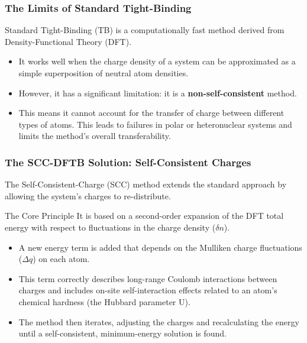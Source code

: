 \begin{frame}
  \frametitle{The Limits of Standard Tight-Binding}
  
  Standard Tight-Binding (TB) is a computationally fast method derived from Density-Functional Theory (DFT). \pause
  
  \begin{itemize}
    \item It works well when the charge density of a system can be approximated as a simple superposition of neutral atom densities. \pause
    
    \item However, it has a significant limitation: it is a \textbf{non-self-consistent} method. \pause
    
    \item This means it cannot account for the transfer of charge between different types of atoms. This leads to failures in polar or heteronuclear systems and limits the method's overall transferability.
  \end{itemize}
\end{frame}

\begin{frame}
  \frametitle{The SCC-DFTB Solution: Self-Consistent Charges}
  
  The Self-Consistent-Charge (SCC) method extends the standard approach by allowing the system's charges to re-distribute. \pause
  
  \begin{block}{The Core Principle}
    It is based on a second-order expansion of the DFT total energy with respect to fluctuations in the charge density ($\delta n$).
  \end{block} \pause
  
  \begin{itemize}
    \item A new energy term is added that depends on the Mulliken charge fluctuations ($\Delta q$) on each atom. \pause
    
    \item This term correctly describes long-range Coulomb interactions between charges and includes on-site self-interaction effects related to an atom's chemical hardness (the Hubbard parameter U). \pause
    
    \item The method then iterates, adjusting the charges and recalculating the energy until a self-consistent, minimum-energy solution is found.
  \end{itemize}
\end{frame}

